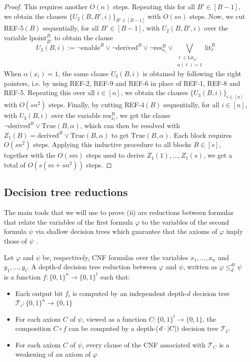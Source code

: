\begin{proof}
    This requires another $O(n)$ steps. Repeating this for all $B' \in [B-1]$, we obtain the clauses $\{U_2(B,B',i)\}_{B' \in [B-1]}$ with $O(sn)$ steps. Now, we cut REF-5$(B)$ sequentially, for all $B' \in [B-1]$, with $U_2(B,B',i)$ over the variable $\mathrm{lpoint}^{B}_{B'}$ to obtain the clause
    \begin{equation}
        U_3(B,i) := \lnot \mathrm{enable}^{B} \lor \lnot \mathrm{derived}^{B} \lor \lnot \mathrm{res}^{B}_{x_i} \lor \bigvee_{\substack{\ell \in \mathrm{Lit}_n :\\ \alpha(\ell) = 1}} \text{lit}^B_{\ell}
    \end{equation}
    When $\alpha(x_i) = 1$, the same clause $U_3(B,i)$ is obtained by following the right pointers, i.e. by using REF-2, REF-9 and REF-6 in place of REF-1, REF-8 and REF-5. Repeating this over all $i \in [n]$, we obtain the clauses $\{U_3(B,i)\}_{i \in [n]}$ with $O(sn^2)$ steps. Finally, by cutting REF-4$(B)$ sequentially, for all $i \in [n]$, with $U_3(B,i)$ over the variable $\mathrm{res}^{B}_{x_i}$, we get the clause $\lnot \mathrm{derived}^B \lor \mathrm{True}(B,\alpha)$, which can then be resolved with $Z_1(B) = \mathrm{derived}^B \lor \mathrm{True}(B,\alpha)$ to get $\mathrm{True}(B,\alpha)$. Each block requires $O(sn^2)$ steps. Applying this inductive procedure to all blocks $B \in [s]$, together with the $O(sm)$ steps used to derive $Z_1(1), \ldots, Z_1(s)$, we get a total of $O(s(m + sn^2))$ steps.
\end{proof}

\subsection{Decision tree reductions}
\label{sec:dt_reductions}

The main tools that we will use to prove (ii) are reductions between formulas that relate the variables of the first formula $\varphi$ to the variables of the second formula $\psi$ via shallow decision trees which guarantee that the axioms of $\varphi$ imply those of $\psi$ \cite{alg_nphard,galesi_toran}.

\begin{definition}
    Let $\varphi$ and $\psi$ be, respectively, CNF formulas over the variables $x_1, \ldots, x_n$ and $y_1, \ldots, y_t$. A depth-$d$ decision tree reduction between $\varphi$ and $\psi$, written as $\varphi \leq_{d}^{dt} \psi$ is a function $f : \{0,1\}^n \to \{0,1\}^t$ such that:
    \begin{itemize}
        \item Each output bit $f_i$ is computed by an independent depth-$d$ decision tree $\mathcal{T}_i : \{0,1\}^n \to \{0,1\}$
        \item For each axiom $C$ of $\psi$, viewed as a function $C : \{0,1\}^t \to \{0,1\}$, the composition $C \circ f$ can be computed by a depth-($d \cdot \left|C\right|)$ decision tree $\mathcal{T}_C$
        \item For each axiom $C$ of $\psi$, every clause of the CNF associated with $\mathcal{T}_C$ is a weakening of an axiom of $\varphi$ 
    \end{itemize}
\end{definition}

